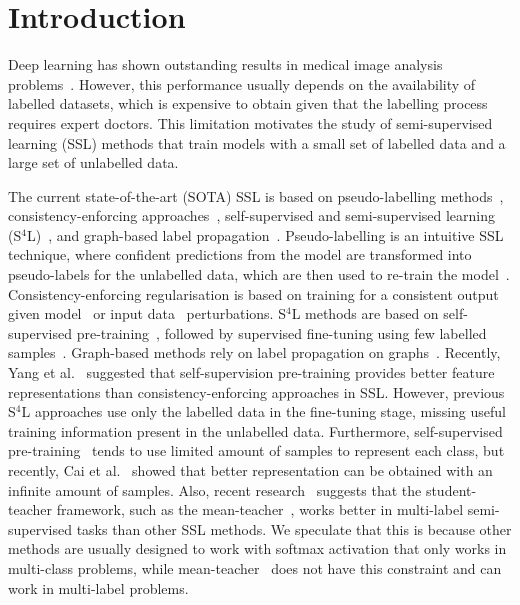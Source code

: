 \documentclass[runningheads]{llncs}
\begin{document}
\section{Introduction}
\vspace{-.1in}
\label{sec:introduction}

Deep learning has shown outstanding results in medical image analysis problems~\cite{lee2017deep,tian2020few,li2018thoracic,tian2019one,liu2020self,jonmohamadi2020automatic}. 
However, this performance usually depends on the availability of labelled datasets, which is expensive to obtain given that the labelling process requires expert doctors.
This limitation motivates the study of semi-supervised learning (SSL) methods that train models with a small set of labelled data and a large set of unlabelled data. 

The current state-of-the-art (SOTA) SSL is based on 
pseudo-labelling methods~\cite{rizve2021defense,lee2013pseudo}, consistency-enforcing approaches~\cite{berthelot2019remixmatch,tarvainen2017mean,laine2016temporal}, self-supervised and semi-supervised learning (S$^4$L)~\cite{chen2020big,zhai2019s4l}, and graph-based label propagation~\cite{aviles2019graphx}.  Pseudo-labelling is an intuitive SSL technique, where confident predictions from the model are transformed into pseudo-labels for the unlabelled data, which are then used to re-train the model~\cite{lee2013pseudo}.
Consistency-enforcing regularisation is based on training for a consistent output given model~\cite{liu2020semi,tarvainen2017mean} or input data~\cite{berthelot2019remixmatch,laine2016temporal} perturbations. 
S$^4$L methods are based on self-supervised pre-training~\cite{moco,simclr}, followed by supervised fine-tuning using few labelled samples~\cite{chen2020big,zhai2019s4l}.
Graph-based methods rely on label propagation on graphs~\cite{aviles2019graphx}.
Recently, Yang et al.~\cite{yang2020rethinking} suggested that self-supervision pre-training provides better feature representations than consistency-enforcing approaches in SSL.  
However, previous S$^4$L approaches use only the labelled data in the fine-tuning stage, missing useful training information present in the unlabelled data. 
Furthermore, self-supervised pre-training~\cite{simclr,moco} tends to use limited amount of samples to represent each class, but recently, Cai et al.~\cite{cai2020joint} showed that better representation can be obtained with an infinite amount of samples.
Also, recent research~\cite{rizve2021defense} suggests that the student-teacher framework, such as the mean-teacher~\cite{tarvainen2017mean}, works better in multi-label semi-supervised tasks
than other SSL methods.
We speculate that this is because other methods are usually designed to work with softmax activation that only works in multi-class problems, while mean-teacher~\cite{tarvainen2017mean} does not have this constraint and can work in multi-label problems.  
\end{document}
